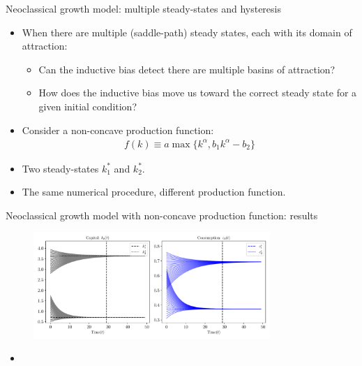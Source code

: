 \documentclass[aspectratio=169,10pt]{beamer}
\begin{document}
\begin{frame}{Neoclassical growth model: multiple steady-states and hysteresis}
	\begin{itemize}
	\item When there are multiple (saddle-path) steady states, each with its domain of attraction:
	\vspace{0.05in}
		\begin{itemize}
			\item Can the inductive bias detect there are multiple basins of attraction?
			\item How does the inductive
		bias move us toward the correct steady state for a given initial condition?
		\end{itemize}
	\vspace{0.05in}
	\item Consider a non-concave production function:
	\begin{align*}
		f(k) \equiv a \max\{k^\alpha, b_1k^\alpha-b_2\}
	\end{align*}
	\item Two steady-states $k_1^*$ and $k_2^*$.
	\vspace{0.05in}
	\item The same numerical procedure, different production function.
		\end{itemize}
\end{frame}

\begin{frame}{Neoclassical growth model with non-concave production function: results}
	\begin{figure}[t!]
		\centering
		\includegraphics[width=0.8\textwidth]{figs/growth_sequential_multiple_steady_states_var_initial_k_0.pdf}
	\end{figure}
	\begin{itemize}
		\item 
	\end{itemize}
\end{frame}
\end{document}
